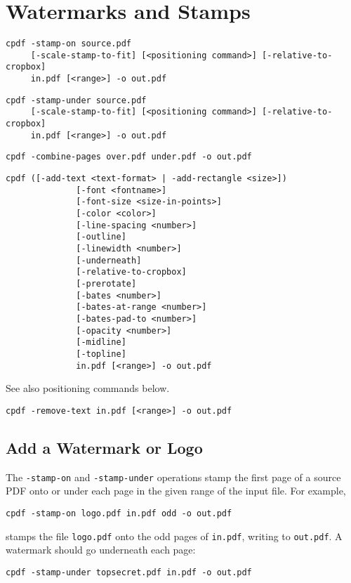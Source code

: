 \documentclass{book}
\begin{document}
\chapter{Watermarks and Stamps}
\label{stamps}
  \begin{framed}
  \noindent\small\verb!cpdf -stamp-on source.pdf!\\
  \noindent\small\verb!     [-scale-stamp-to-fit] [<positioning command>] [-relative-to-cropbox] !\\
  \noindent\small\verb!     in.pdf [<range>] -o out.pdf!
  
  \vspace{1.5mm}
  \noindent\small\verb!cpdf -stamp-under source.pdf!\\
  \noindent\small\verb!     [-scale-stamp-to-fit] [<positioning command>] [-relative-to-cropbox]!\\
  \noindent\small\verb!     in.pdf [<range>] -o out.pdf!

  \vspace{1.5mm}
  \noindent\small\verb!cpdf -combine-pages over.pdf under.pdf -o out.pdf!

  \vspace{1.5mm}
  \noindent\small\begin{verbatim}cpdf ([-add-text <text-format> | -add-rectangle <size>])
              [-font <fontname>]
              [-font-size <size-in-points>]
              [-color <color>]
              [-line-spacing <number>]
              [-outline]
              [-linewidth <number>]
              [-underneath]
              [-relative-to-cropbox]
              [-prerotate]
              [-bates <number>]
              [-bates-at-range <number>]
              [-bates-pad-to <number>]
              [-opacity <number>]
              [-midline]
              [-topline]
              in.pdf [<range>] -o out.pdf\end{verbatim}
  \noindent See also positioning commands below.

  \vspace{1.5mm}
  \noindent\small\verb!cpdf -remove-text in.pdf [<range>] -o out.pdf!
  \end{framed}
  \section{Add a Watermark or Logo}
  The \texttt{-stamp-on} and \texttt{-stamp-under} operations stamp the first
page of a source PDF onto or under each page in the given range of the input
file. For example,
  \begin{framed}
    \small\verb!cpdf -stamp-on logo.pdf in.pdf odd -o out.pdf!
  \end{framed}
\noindent stamps the file \texttt{logo.pdf} onto the odd pages of \texttt{in.pdf},
writing to \texttt{out.pdf}. A watermark should go underneath each page:
  \begin{framed}
    \small\verb!cpdf -stamp-under topsecret.pdf in.pdf -o out.pdf!
  \end{framed}
\end{document}
